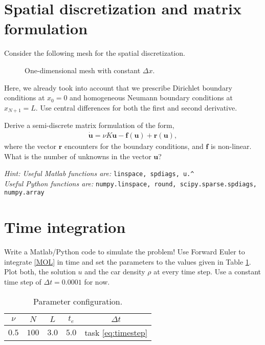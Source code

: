 \documentclass[a4paper,10pt]{article}
\begin{document}
\section{Spatial discretization and matrix formulation}
Consider the following mesh for the spatial discretization.
\begin{figure}[ht]
\centering
{}
\caption{One-dimensional mesh with constant $\Delta x$.}
\end{figure}
Here, we already took into account that we prescribe Dirichlet boundary conditions at $x_0 = 0$ and homogeneous Neumann boundary conditions at $x_{N+1} = L$. Use central differences for both the first and second derivative.

Derive a semi-discrete matrix formulation of the form,
\begin{align}
\label{MOL}
\dot{\mathbf{u}} = \nu K \mathbf{u} - \mathbf{f}(\mathbf{u}) + \mathbf{r}(\mathbf{u}),
\end{align}
where the vector $\mathbf{r}$ encounters for the boundary conditions, and $\mathbf{f}$ is non-linear. What is the number of unknowns in the vector $\mathbf{u}$?

\textit{Hint: Useful Matlab functions are: } \texttt{linspace, spdiags, u.\^ }\\
\textit{\phantom{\indent Hint:} Useful Python functions are: } \texttt{numpy.linspace, round, scipy.sparse.spdiags,}\\
 \texttt{numpy.array}
\section{Time integration}
\label{ch:euler}
Write a Matlab/Python code to simulate the problem! Use Forward Euler to integrate \eqref{MOL} in time and set the parameters to the values given in Table \ref{params}. Plot both, the solution $u$ and the car density $\rho$ at every time step. Use a constant time step of $\Delta t = 0.0001$ for now.
\begin{table}[ht]
\centering
 \begin{tabular}{|c|c|c|c|c|}
  \hline
  $\nu$ & $N$ & $L$ & $t_e$ & $\Delta t$\\
  \hline
  $0.5$ & $100$ & $3.0$ & $5.0$ & task \ref{eq:timestep}\\
  \hline
 \end{tabular}
\caption{Parameter configuration.}\label{params}
\end{table}
\end{document}
